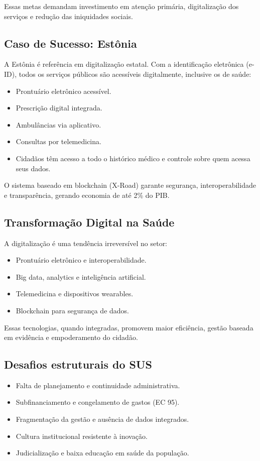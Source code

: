 \documentclass[a4paper,12pt]{article}
\begin{document}
Essas metas demandam investimento em atenção primária, digitalização dos serviços e redução das iniquidades sociais.
\subsection{Caso de Sucesso: Estônia}
\label{sec:org0fd8a3b}
A Estônia é referência em digitalização estatal. Com a identificação eletrônica (e-ID), todos os serviços públicos são acessíveis digitalmente, inclusive os de saúde:
\begin{itemize}
\item Prontuário eletrônico acessível.
\item Prescrição digital integrada.
\item Ambulâncias via aplicativo.
\item Consultas por telemedicina.
\item Cidadãos têm acesso a todo o histórico médico e controle sobre quem acessa seus dados.
\end{itemize}

O sistema baseado em blockchain (X-Road) garante segurança, interoperabilidade e transparência, gerando economia de até 2\% do PIB.
\subsection{Transformação Digital na Saúde}
\label{sec:org627d1e3}
A digitalização é uma tendência irreversível no setor:
\begin{itemize}
\item Prontuário eletrônico e interoperabilidade.
\item Big data, analytics e inteligência artificial.
\item Telemedicina e dispositivos wearables.
\item Blockchain para segurança de dados.
\end{itemize}

Essas tecnologias, quando integradas, promovem maior eficiência, gestão baseada em evidência e empoderamento do cidadão.
\subsection{Desafios estruturais do SUS}
\label{sec:orgf045fd9}
\begin{itemize}
\item Falta de planejamento e continuidade administrativa.
\item Subfinanciamento e congelamento de gastos (EC 95).
\item Fragmentação da gestão e ausência de dados integrados.
\item Cultura institucional resistente à inovação.
\item Judicialização e baixa educação em saúde da população.
\end{itemize}
\end{document}
